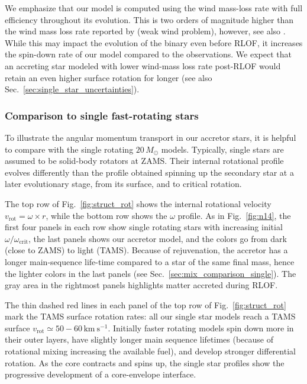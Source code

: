 \documentclass[twocolumn,twocolappendix,trackchanges]{aastex63}
\newcommand{\kms}{{\mathrm{km\ s^{-1}}}}
\DeclareRobustCommand{\Figref}[1]{Fig.~\ref{#1}}
\DeclareRobustCommand{\Secref}[1]{Sec.~\ref{#1}}
\begin{document}
We emphasize that our model is computed using the \cite{vink:00,
  vink:01} wind mass-loss rate with full efficiency throughout its
evolution. This is two orders of magnitude higher than the wind mass
loss rate reported by \cite{marcolino:09} (weak wind problem),
however, see also \citealt{lucy:12, lagae:21}. While this may impact
the evolution of the binary even before RLOF, it increases the
spin-down rate of our model compared to the observations. We expect
that an accreting star modeled with lower wind-mass loss rate
post-RLOF would retain an even higher surface rotation for longer (see
also \Secref{sec:single_star_uncertainties}).


\subsubsection{Comparison to single fast-rotating stars}


To illustrate the angular momentum transport in our accretor stars, it
is helpful to compare with the single rotating $20\,M_\odot$
models. Typically, single stars are assumed to be solid-body rotators at
ZAMS. Their internal rotational profile evolves differently than the profile
obtained spinning up the secondary star at a later evolutionary stage,
from its surface, and to critical rotation.

The top row of \Figref{fig:struct_rot} shows the internal rotational
velocity $v_\mathrm{rot}=\omega\times r$, while the bottom row shows
the $\omega$ profile. As in \Figref{fig:n14}, the first four panels in
each row show single rotating stars with increasing initial
$\omega/\omega_\mathrm{crit}$, the last panels shows our accretor
model, and the colors go from dark (close to ZAMS) to light
(TAMS). Because of rejuvenation, the accretor has a longer
main-sequence life-time compared to a star of the same final mass,
hence the lighter colors in the last panels (see
\Secref{sec:mix_comparison_single}). The gray area in the rightmost
panels highlights matter accreted during RLOF.

The thin dashed red lines in each panel of the top row of
\Figref{fig:struct_rot} mark the TAMS surface rotation rates: all our
single star models reach a TAMS surface
$v_\mathrm{rot}\simeq50-60\,\kms$. Initially faster rotating models
spin down more in their outer layers, have slightly longer main
sequence lifetimes (because of rotational mixing increasing the
available fuel), and develop stronger differential rotation. As the
core contracts and spins up, the single star profiles show the
progressive development of a core-envelope interface.
\end{document}
